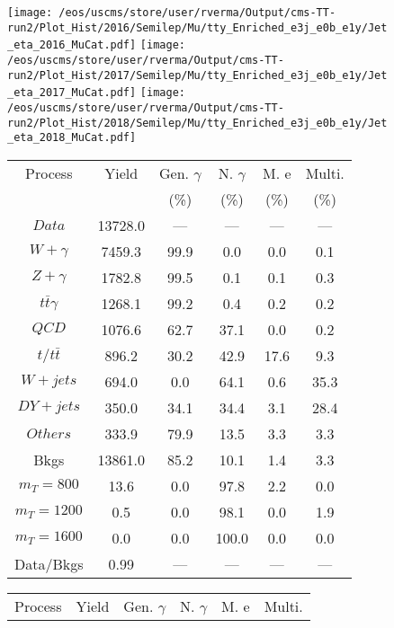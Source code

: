 \begin{figure}
\centering
\texttt{[image: /eos/uscms/store/user/rverma/Output/cms-TT-run2/Plot\_Hist/2016/Semilep/Mu/tty\_Enriched\_e3j\_e0b\_e1y/Jet\_eta\_2016\_MuCat.pdf]}
\texttt{[image: /eos/uscms/store/user/rverma/Output/cms-TT-run2/Plot\_Hist/2017/Semilep/Mu/tty\_Enriched\_e3j\_e0b\_e1y/Jet\_eta\_2017\_MuCat.pdf]}
\texttt{[image: /eos/uscms/store/user/rverma/Output/cms-TT-run2/Plot\_Hist/2018/Semilep/Mu/tty\_Enriched\_e3j\_e0b\_e1y/Jet\_eta\_2018\_MuCat.pdf]}
\begin{minipage}[c]{0.32\textwidth}
\centering
\tiny{
\begin{tabular}{cccccc}
\hline
Process & Yield & Gen. $\gamma$ & N. $\gamma$ & M. e & Multi. \\
 &  & (\%) & (\%) & (\%) & (\%)  \\
\hline
                                                                      $ Data $ &  13728.0 &  --- &  --- &  --- &  ---\\
$ W+\gamma $ &  7459.3 &  99.9 &  0.0 &  0.0 &  0.1\\
$ Z+\gamma $ &  1782.8 &  99.5 &  0.1 &  0.1 &  0.3\\
$ t\bar{t}\gamma $ &  1268.1 &  99.2 &  0.4 &  0.2 &  0.2\\
$ QCD $ &  1076.6 &  62.7 &  37.1 &  0.0 &  0.2\\
$ t/t\bar{t} $ &  896.2 &  30.2 &  42.9 &  17.6 &  9.3\\
$ W+jets $ &  694.0 &  0.0 &  64.1 &  0.6 &  35.3\\
$ DY+jets $ &  350.0 &  34.1 &  34.4 &  3.1 &  28.4\\
$ Others $ &  333.9 &  79.9 &  13.5 &  3.3 &  3.3\\
Bkgs &  13861.0 &  85.2 &  10.1 &  1.4 &  3.3\\
$ m_{T} = 800 $ &  13.6 &  0.0 &  97.8 &  2.2 &  0.0\\
$ m_{T} = 1200 $ &  0.5 &  0.0 &  98.1 &  0.0 &  1.9\\
$ m_{T} = 1600 $ &  0.0 &  0.0 &  100.0 &  0.0 &  0.0\\
Data/Bkgs &  0.99 &  --- &  --- &  --- &  ---\\
\hline
\end{tabular}
}
\end{minipage}
\begin{minipage}[c]{0.32\textwidth}
\centering
\tiny{
\begin{tabular}{cccccc}
\hline
Process & Yield & Gen. $\gamma$ & N. $\gamma$ & M. e & Multi. \\

\end{tabular}}
\end{minipage}
\end{figure}
